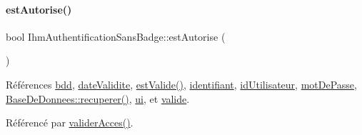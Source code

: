\paragraph{\texorpdfstring{est\+Autorise()}{estAutorise()}}
{\footnotesize\ttfamily bool Ihm\+Authentification\+Sans\+Badge\+::est\+Autorise (\begin{DoxyParamCaption}{ }\end{DoxyParamCaption})}



Références \hyperlink{class_ihm_authentification_sans_badge_acf93b261335b6128af77de61994b9491}{bdd}, \hyperlink{class_ihm_authentification_sans_badge_afd0f3b5e59208d58be78f0cb741d4be7}{date\+Validite}, \hyperlink{class_ihm_authentification_sans_badge_a676cfdbf93ef79fb7c4c47fdd8d0fb43}{est\+Valide()}, \hyperlink{class_ihm_authentification_sans_badge_aff90fe3fcf957daa57ca0318a4b1a2d0}{identifiant}, \hyperlink{class_ihm_authentification_sans_badge_a2ff19fe279947b469dbc48b6ff2db187}{id\+Utilisateur}, \hyperlink{class_ihm_authentification_sans_badge_a3a5c5887be56c7f1b5dcd1bf824d09c4}{mot\+De\+Passe}, \hyperlink{class_base_de_donnees_a77539baad389f5acf754cd2cd452403e}{Base\+De\+Donnees\+::recuperer()}, \hyperlink{class_ihm_authentification_sans_badge_a95e8a9d049b6e5f262b45e3362d2bbee}{ui}, et \hyperlink{class_ihm_authentification_sans_badge_a653eb9abd54ba736b3d98b994a7e4f1f}{valide}.



Référencé par \hyperlink{class_ihm_authentification_sans_badge_a1d6f062da30edd3ba8fe74906e8f16cf}{valider\+Acces()}.


